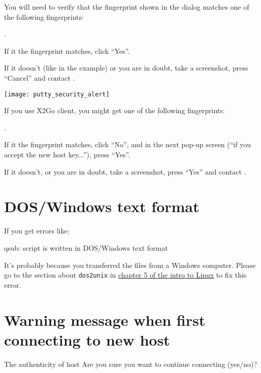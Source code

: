 You will need to verify that the fingerprint shown in the dialog matches one of the
following fingerprints:

\puttyFirstConnect

.

If it the fingerprint matches, click ``Yes''.

If it doesn't (like in the example) or you are in doubt, take a screenshot, press ``Cancel'' and contact \hpcinfo.

\sshedfingerprintnote

\texttt{[image: putty\_security\_alert]}

\ifgent
If you use X2Go client, you might get one of the following fingerprints:

\xtwogoshaone

.

If it the fingerprint matches, click ``No'', and in the next pop-up screen (``if you accept the new host key...''), press ``Yes''.

If it doesn't, or you are in doubt, take a screenshot, press ``Yes'' and contact \hpcinfo.
\fi 

\fi


\section{DOS/Windows text format}

If you get errors like:

\begin{prompt}
qsub:  script is written in DOS/Windows text format
\end{prompt}

It's probably because you transferred the files from a Windows computer.
Please go to the section about \lstinline|dos2unix| in \href{\LinuxManualURL#sec:dos2unix}{chapter 5 of the intro to Linux}
to fix this error.

\section{Warning message when first connecting to new host}
\label{sec:warning-message-new-host}

\ifmacORlinux
\begin{prompt}
The authenticity of host %
Are you sure you want to continue connecting (yes/no)?
\end{prompt}

